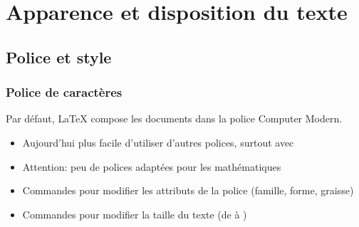
\section{Apparence et disposition du texte}

\subsection{Police et style}

\begin{frame}
  \frametitle{Police de caractères}

  Par défaut, {\LaTeX} compose les documents dans la police
  {\CM Computer Modern}.

  \begin{itemize}
  \item Aujourd'hui plus facile d'utiliser d'autres polices, surtout
    avec {\XeLaTeX}
  \item \alert{Attention}: peu de polices adaptées pour les
    mathématiques
  \item Commandes pour modifier les \alert{attributs} de la police
    (famille, forme, graisse)
  \item Commandes pour modifier la \alert{taille} du texte (de
     à )
  \end{itemize}
\end{frame}

